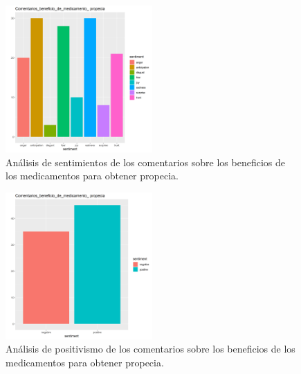 \documentclass[spanish,]{article}
\newenvironment{Shaded}{\begin{snugshade}}{\end{snugshade}}
\newcommand{\KeywordTok}[1]{\textcolor[rgb]{0.13,0.29,0.53}{\textbf{#1}}}
\newcommand{\StringTok}[1]{\textcolor[rgb]{0.31,0.60,0.02}{#1}}
\newcommand{\ControlFlowTok}[1]{\textcolor[rgb]{0.13,0.29,0.53}{\textbf{#1}}}
\newcommand{\OperatorTok}[1]{\textcolor[rgb]{0.81,0.36,0.00}{\textbf{#1}}}
\newcommand{\NormalTok}[1]{#1}
\begin{document}
\begin{Shaded}
\end{Shaded}

\begin{figure}[ht]
    \centering
    \includegraphics[width=0.5\textwidth]{figuras/elegidas/Comentarios_beneficio_de_medicamento_propecia.png}
    \caption{Análisis de sentimientos de los comentarios sobre los beneficios de los medicamentos para obtener propecia.}
    \label{fig:sentimientos:propeciaSentimiento}
\end{figure}

\begin{figure}[ht]
    \centering
    \includegraphics[width=0.5\textwidth]{figuras/elegidas/Comentarios_beneficio_de_medicamento_propecia_positivismo.png}
    \caption{Análisis de positivismo de los comentarios sobre los beneficios de los medicamentos para obtener propecia.}
    \label{fig:sentimientos:propeciaSentimiento}
\end{figure}
\end{document}

